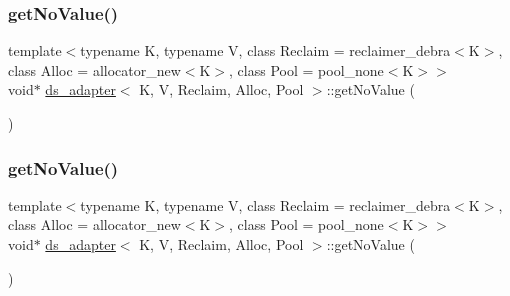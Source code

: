 \mbox{\label{classds__adapter_adb631e454b8146520f601d1a86c6c72c}} 
\subsubsection{\texorpdfstring{get\+No\+Value()}{getNoValue()}\hspace{0.1cm}{\footnotesize\ttfamily [22/26]}}
{\footnotesize\ttfamily template$<$typename K, typename V, class Reclaim = reclaimer\+\_\+debra$<$\+K$>$, class Alloc = allocator\+\_\+new$<$\+K$>$, class Pool = pool\+\_\+none$<$\+K$>$$>$ \\
void$\ast$ \hyperlink{classds__adapter}{ds\+\_\+adapter}$<$ K, V, Reclaim, Alloc, Pool $>$\+::get\+No\+Value (\begin{DoxyParamCaption}{ }\end{DoxyParamCaption})\hspace{0.3cm}{\ttfamily [inline]}}

\mbox{\label{classds__adapter_adb631e454b8146520f601d1a86c6c72c}} 
\subsubsection{\texorpdfstring{get\+No\+Value()}{getNoValue()}\hspace{0.1cm}{\footnotesize\ttfamily [23/26]}}
{\footnotesize\ttfamily template$<$typename K, typename V, class Reclaim = reclaimer\+\_\+debra$<$\+K$>$, class Alloc = allocator\+\_\+new$<$\+K$>$, class Pool = pool\+\_\+none$<$\+K$>$$>$ \\
void$\ast$ \hyperlink{classds__adapter}{ds\+\_\+adapter}$<$ K, V, Reclaim, Alloc, Pool $>$\+::get\+No\+Value (\begin{DoxyParamCaption}{ }\end{DoxyParamCaption})\hspace{0.3cm}{\ttfamily [inline]}}

\mbox{\label{classds__adapter_adb631e454b8146520f601d1a86c6c72c}} 
